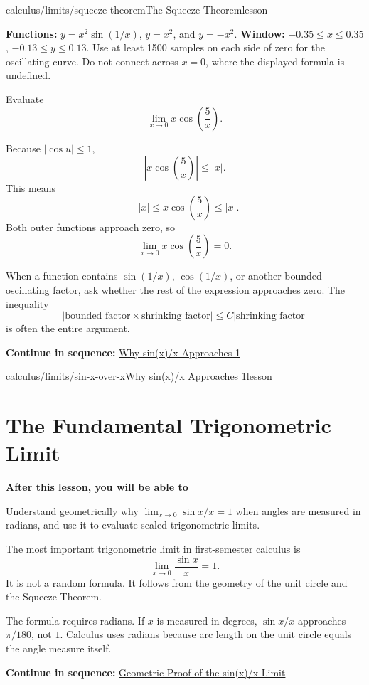 \documentclass[11pt,openany]{book}
\theoremstyle{bgplain}
\newcounter{bgexample}[chapter]
\newcommand{\webnext}[2]{%
  \par\addvspace{1.2em}\noindent{\color{BGLine}\rule{\textwidth}{0.35pt}}\par\smallskip
  {\small\color{BGGray}\textbf{Continue in sequence:} \hyperlink{web:#1}{#2}}\par
}
\newcommand{\lessonobjective}[1]{%
  \par\Needspace{4\baselineskip}\addvspace{0.6em}%
  {\bfseries\color{BGInk}After this lesson, you will be able to}\par\smallskip
  #1\par\addvspace{0.5em}%
}
\begin{document}
\begin{webpage}{calculus/limits/squeeze-theorem}{The Squeeze Theorem}{lesson}
\begin{bggraphspec}
\textbf{Functions:} \(y=x^2\sin(1/x)\), \(y=x^2\), and \(y=-x^2\). \textbf{Window:} \(-0.35\le x\le0.35\), \(-0.13\le y\le0.13\). Use at least 1500 samples on each side of zero for the oscillating curve. Do not connect across \(x=0\), where the displayed formula is undefined.
\end{bggraphspec}

\begin{bgexample}[title={Absolute-value squeeze}]
Evaluate
\[
  \lim_{x\to0}x\cos\left(\frac{5}{x}\right).
\]

\begin{bgsolution}
Because \(|\cos u|\le1\),
\[
  \left|x\cos\left(\frac5x\right)\right|
  \le |x|.
\]
This means
\[
  -|x|\le x\cos\left(\frac5x\right)\le|x|.
\]
Both outer functions approach zero, so
\[
  \boxed{\lim_{x\to0}x\cos\left(\frac5x\right)=0}.
\]
\end{bgsolution}
\end{bgexample}

\begin{bghomework}
When a function contains \(\sin(1/x)\), \(\cos(1/x)\), or another bounded oscillating factor, ask whether the rest of the expression approaches zero. The inequality
\[
  |\text{bounded factor}\times\text{shrinking factor}|
  \le C|\text{shrinking factor}|
\]
is often the entire argument.
\end{bghomework}
\webnext{calculus/limits/sin-x-over-x}{Why sin(x)/x Approaches 1}
\end{webpage}

\begin{webpage}{calculus/limits/sin-x-over-x}{Why sin(x)/x Approaches 1}{lesson}
\section{The Fundamental Trigonometric Limit}

\lessonobjective{
Understand geometrically why \(\lim_{x\to0}\sin x/x=1\) when angles are measured in radians, and use it to evaluate scaled trigonometric limits.
}

The most important trigonometric limit in first-semester calculus is
\[
  \boxed{\lim_{x\to0}\frac{\sin x}{x}=1}.
\]
It is not a random formula. It follows from the geometry of the unit circle and the Squeeze Theorem.

\begin{bgmistake}
The formula requires radians. If \(x\) is measured in degrees, \(\sin x/x\) approaches \(\pi/180\), not \(1\). Calculus uses radians because arc length on the unit circle equals the angle measure itself.
\end{bgmistake}
\webnext{calculus/limits/sin-x-over-x-proof}{Geometric Proof of the sin(x)/x Limit}
\end{webpage}
\end{document}
